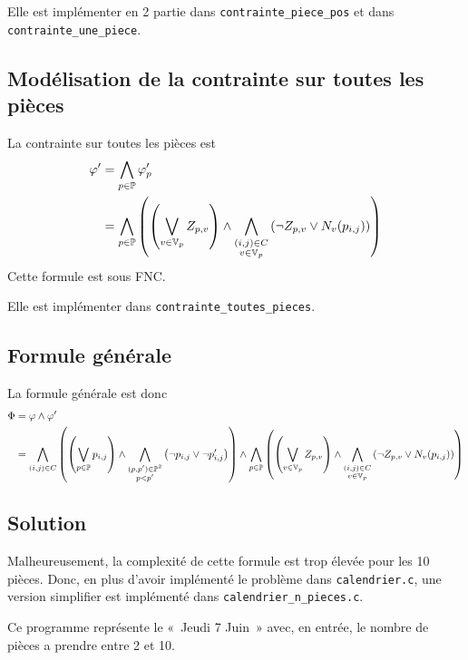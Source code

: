 Elle est implémenter en 2 partie dans \verb|contrainte_piece_pos|
et dans \verb|contrainte_une_piece|.

\subsection{Modélisation de la contrainte sur toutes les pièces}
La contrainte sur toutes les pièces est
\begin{align*}
    \varphi' &= \bigwedge_{p\in\mathbb{P}}  \varphi'_p \\
             &= \bigwedge_{p\in\mathbb{P}} \left(\left( \bigvee_{v\in\mathbb{V}_p} Z_{p,v} \right) \land
                \bigwedge_{\substack{(i,j)\in C\\v\in\mathbb{V}_p}} \left(\lnot Z_{p,v} \lor N_v(p_{i,j}) \right)\right)
\end{align*}
Cette formule est sous FNC.

Elle est implémenter dans \verb|contrainte_toutes_pieces|.

\subsection{Formule générale}
La formule générale est donc
\begin{align*}
\Phi &= \varphi \land \varphi' \\
     &= \bigwedge_{(i,j)\in C} \left(\left(\bigvee_{p\in\mathbb{P}} p_{i,j} \right) \land
        \bigwedge_{\substack{(p,p')\in\mathbb{P}^2\\p<p'}}\left(\lnot p_{i,j} \lor \lnot p'_{i,j}\right)\right) \land
        \bigwedge_{p\in\mathbb{P}} \left(\left( \bigvee_{v\in\mathbb{V}_p} Z_{p,v} \right) \land
        \bigwedge_{\substack{(i,j)\in C\\v\in\mathbb{V}_p}} \left(\lnot Z_{p,v} \lor N_v(p_{i,j}) \right)\right)
\end{align*}

\subsection{Solution}
Malheureusement, la complexité de cette formule est trop élevée pour les 10 pièces.
Donc, en plus d'avoir implémenté le problème dans \verb|calendrier.c|,
une version simplifier est implémenté dans \verb|calendrier_n_pieces.c|.

Ce programme représente le «~Jeudi 7 Juin~» avec, en entrée,
le nombre de pièces a prendre entre 2 et 10.

